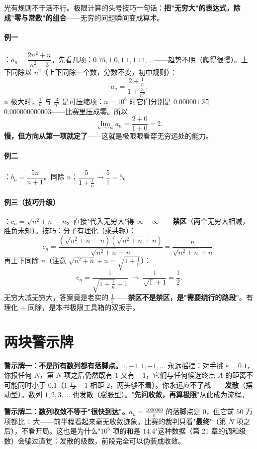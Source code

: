 光有规则不干活不行。极限计算的头号技巧一句话：\textbf{把"无穷大"的表达式，除成"零与常数"的组合}——无穷的问题瞬间变成算术。

\paragraph{例一}：$a_n = \dfrac{2n^2 + n}{n^2 + 3}$。先看几项：$0.75, 1.0, 1.1, 1.14, \dots$——趋势不明（爬得很慢）。上下同除以 $n^2$（上下同除一个数，分数不变，初中规则）：
\[
a_n = \frac{2 + \frac{1}{n}}{1 + \frac{3}{n^2}} .
\]
$n$ 极大时，$\tfrac1n$ 与 $\tfrac{3}{n^2}$ 是可压缩项：$n = 10^6$ 时它们分别是 $0.000001$ 和 $0.000000000003$——比赛里压成零。所以
\[
\lim_{n\to\infty} a_n = \frac{2+0}{1+0} = 2 .
\]
\textbf{慢，但方向从第一项就定了}——这就是极限眼看穿无穷远处的能力。

\paragraph{例二}：$b_n = \dfrac{5n}{n+1}$。同除 $n$：$\dfrac{5}{1 + \tfrac1n} \to \dfrac51 = 5$。

\paragraph{例三（技巧升级）}：$c_n = \sqrt{n^2+n} - n$。直接"代入无穷大"得 $\infty - \infty$——\textbf{禁区}（两个无穷大相减，胜负未知）。技巧：分子有理化（乘共轭）：
\[
c_n = \frac{(\sqrt{n^2+n} - n)(\sqrt{n^2+n} + n)}{\sqrt{n^2+n} + n} = \frac{n}{\sqrt{n^2+n} + n},
\]
再上下同除 $n$（注意 $\sqrt{n^2+n} \div n = \sqrt{1 + \tfrac1n}$）：
\[
c_n = \frac{1}{\sqrt{1+\frac1n} + 1} \;\longrightarrow\; \frac{1}{\sqrt1 + 1} = \frac12 .
\]
无穷大减无穷大，答案竟是老实的 $\tfrac12$——\textbf{禁区不是禁区，是"需要绕行的路段"}。有理化 $+$ 同除，是本书极限工具箱的双扳手。

\section{两块警示牌}

\textbf{警示牌一：不是所有数列都有落脚点。}$1, -1, 1, -1, \dots$ 永远摇摆：对手挑 $\varepsilon = 0.1$，你报任何 $N$，第 $N$ 项之后仍然既有 $1$ 又有 $-1$，它们与任何候选终点 $A$ 的距离不可能同时小于 $0.1$（$1$ 与 $-1$ 相距 $2$，两头够不着）。你永远应不了战——\textbf{发散}（摆动型）。数列 $1, 2, 3, \dots$ 也发散（膨胀型）。"\textbf{先问收敛，再算极限}"从此成为流程。

\textbf{警示牌二：数列收敛不等于"很快到达"。}$a_n = \tfrac{1000000}{n}$ 的落脚点是 $0$，但它前 $50$ 万项都比 $1$ 大——前半程看起来毫无收敛迹象。比赛的裁判只看"\textbf{最终}"（第 $N$ 项之后），不看开局。这也是为什么"$10^6$ 项的和是 $14.4$"这种数据（第 21 章的调和级数）会骗过直觉：发散的级数，前段完全可以伪装成收敛。

